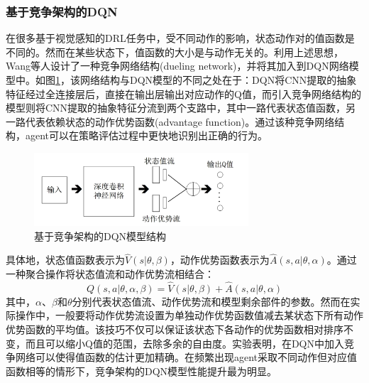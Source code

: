 \documentclass[bachelor]{thesis-uestc}
\begin{document}
	\subsubsection{基于竞争架构的DQN}
	在很多基于视觉感知的DRL任务中，受不同动作的影响，状态动作对的值函数是不同的。然而在某些状态下，值函数的大小是与动作无关的。利用上述思想，Wang等人\cite{wang2015dueling}设计了一种竞争网络结构(dueling network)，并将其加入到DQN网络模型中。如图\ref{fg3}，该网络结构与DQN模型的不同之处在于：DQN将CNN提取的抽象特征经过全连接层后，直接在输出层输出对应动作的Q值，而引入竞争网络结构的模型则将CNN提取的抽象特征分流到两个支路中，其中一路代表状态值函数，另一路代表依赖状态的动作优势函数(advantage function)。通过该种竞争网络结构，agent可以在策略评估过程中更快地识别出正确的行为。
	\begin{figure}
		\includegraphics[width=8cm]{./pic/fg3.jpg}
		\caption{基于竞争架构的DQN模型结构}
		\label{fg3}
	\end{figure}
	具体地，状态值函数表示为$\hat{V}(s|\theta,\beta)$，动作优势函数表示为$\hat{A}(s,a|\theta,\alpha)$。通过一种聚合操作将状态值流和动作优势流相结合：
	\begin{equation}
		\label{eq13}
		Q(s,a|\theta,\alpha,\beta)=\hat{V}(s|\theta,\beta)+\hat{A}(s,a|\theta,\alpha)
	\end{equation}
	其中，$\alpha$、$\beta$和$\theta$分别代表状态值流、动作优势流和模型剩余部件的参数。然而在实际操作中，一般要将动作优势流设置为单独动作优势函数值减去某状态下所有动作优势函数的平均值。该技巧不仅可以保证该状态下各动作的优势函数相对排序不变，而且可以缩小Q值的范围，去除多余的自由度。实验表明，在DQN中加入竞争网络可以使得值函数的估计更加精确。在频繁出现agent采取不同动作但对应值函数相等的情形下，竞争架构的DQN模型性能提升最为明显。
	
\end{document}
